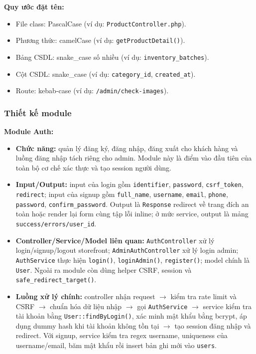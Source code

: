 \documentclass[a4paper]{article}
\begin{document}
\textbf{Quy ước đặt tên:}
\begin{itemize}
    \item File class: PascalCase (ví dụ: \texttt{ProductController.php}).
    \item Phương thức: camelCase (ví dụ: \texttt{getProductDetail()}).
    \item Bảng CSDL: snake\_case số nhiều (ví dụ: \texttt{inventory\_batches}).
    \item Cột CSDL: snake\_case (ví dụ: \texttt{category\_id}, \texttt{created\_at}).
    \item Route: kebab-case (ví dụ: \texttt{/admin/check-images}).
\end{itemize}

\subsubsection{Thiết kế module}

\textbf{Module Auth:}
\begin{itemize}
    \item \textbf{Chức năng:} quản lý đăng ký, đăng nhập, đăng xuất cho khách hàng và luồng đăng nhập tách riêng cho admin. Module này là điểm vào đầu tiên của toàn bộ cơ chế xác thực và tạo session người dùng.
    \item \textbf{Input/Output:} input của login gồm \texttt{identifier}, \texttt{password}, \texttt{csrf\_token}, \texttt{redirect}; input của signup gồm \texttt{full\_name}, \texttt{username}, \texttt{email}, \texttt{phone}, \texttt{password}, \texttt{confirm\_password}. Output là \texttt{Response} redirect về trang đích an toàn hoặc render lại form cùng tập lỗi inline; ở mức service, output là mảng \texttt{success/errors/user\_id}.
    \item \textbf{Controller/Service/Model liên quan:} \texttt{AuthController} xử lý login/signup/logout storefront; \texttt{AdminAuthController} xử lý login admin; \texttt{AuthService} thực hiện \texttt{login()}, \texttt{loginAdmin()}, \texttt{register()}; model chính là \texttt{User}. Ngoài ra module còn dùng helper CSRF, session và \texttt{safe\_redirect\_target()}.
    \item \textbf{Luồng xử lý chính:} controller nhận request $\to$ kiểm tra rate limit và CSRF $\to$ chuẩn hóa dữ liệu nhập $\to$ gọi \texttt{AuthService} $\to$ service kiểm tra tài khoản bằng \texttt{User::findByLogin()}, xác minh mật khẩu bằng bcrypt, áp dụng dummy hash khi tài khoản không tồn tại $\to$ tạo session đăng nhập và redirect. Với signup, service kiểm tra regex username, uniqueness của username/email, băm mật khẩu rồi insert bản ghi mới vào \texttt{users}.
\end{itemize}
\end{document}

